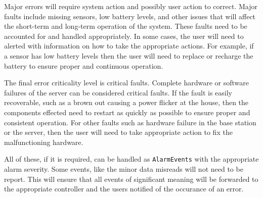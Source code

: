 \documentclass{report}
\begin{document}
Major errors will require system action and possibly user action to correct.
Major faults include missing sensors, low battery levels, and other issues that
will affect the short-term and long-term operation of the system. These faults
need to be accounted for and handled appropriately. In some cases, the user
will need to alerted with information on how to take the appropriate actions.
For example, if a sensor has low battery levels then the user will need to
replace or recharge the battery to ensure proper and continuous operation.

The final error criticality level is critical faults. Complete hardware or
software failures of the server can be considered critical faults. If the fault
is easily recoverable, such as a brown out causing a power flicker at the
house, then the components effected need to restart as quickly as possible to
ensure proper and consistent operation. For other faults such as hardware
failure in the base station or the server, then the user will need to take
appropriate action to fix the malfunctioning hardware.

All of these, if it is required, can be handled as \texttt{AlarmEvents} with
the appropriate alarm severity. Some events, like the minor data misreads will
not need to be report. This will ensure that all events of significant meaning
will be forwarded to the appropriate controller and the users notified of the
occurance of an error.
\end{document}

